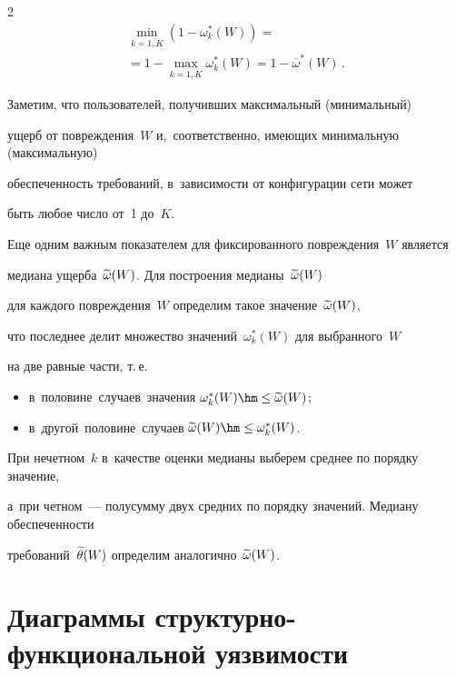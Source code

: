 \begin{multicols}{2}
\begin{multline*}
\min\limits_{k = \overline{1, K}}\left(1 - \omega_k^*(W)\right) ={}\\


{}= 1 - 


\max_{k = \overline{1, K}}\omega_k^*(W) = 1 - \overline {\omega}^*(W)\,.  


\end{multline*}


Заметим, что пользователей, получивших максимальный (минимальный) 


ущерб от повреждения~$W$ и,~соответственно, имеющих минимальную (максимальную) 


обеспеченность требований,  в~зависимости от конфигурации сети может 


быть любое число от~1 до~$K$.





Еще одним важным показателем для фиксированного повреждения~$W$ является 


медиана ущерба~$\widetilde{\omega}(W)$. Для построения медианы~$\widetilde{\omega}(W)$  


для каждого повреждения~$W$ определим такое значение~$\widetilde{\omega}(W)$, 


что последнее делит множество значений~$\omega_k^*(W)$ для выбранного~$W$ 


на две равные части, т.\,е. 


\begin{itemize}


\item в~половине~случаев~значения $\omega_k^*(W) \hm\le \wl{\omega}(W)$;


\item


в~другой~половине~случаев $\wl{\omega}(W) \hm\leq \omega_k^*(W)$.


\end{itemize}


При нечетном~$k$ в~качестве оценки медианы выберем  среднее по порядку значение, 


а~при четном~--- полусумму двух средних по порядку значений. Медиану обеспеченности 


требований~$\widetilde{\theta}(W)$ определим аналогично~$\widetilde{\omega}(W)$. 





\section{Диаграммы структурно-функциональной уязвимости}






\end{multicols}
